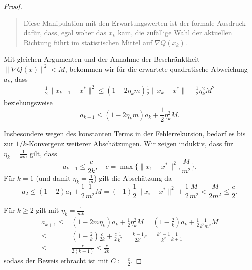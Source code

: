 \documentclass[
]{book}
\newenvironment {JHSAYS} [0] {\begin{quote}\color{jhsc}} {\end{quote}}
\theoremstyle{definition}
\theoremstyle{definition}
\theoremstyle{definition}
\theoremstyle{definition}
\theoremstyle{remark}
\begin{document}
\begin{proof}
\leavevmode\hypertarget{sdg-cnv-independent}{}%
\begin{JHSAYS}
Diese Manipulation mit den Erwartungswerten ist der formale Ausdruck dafür, dass, egal woher das \(x_k\) kam, die zufällige Wahl der aktuellen Richtung führt im statistischen Mittel auf \(\nabla Q(x_k)\).

\end{JHSAYS}

Mit gleichen Argumenten und der Annahme der Beschränktheit \(\|\nabla Q(x)\|^2 < M\), bekommen wir für die erwartete quadratische Abweichung \(a_k\), dass
\begin{equation*}
\begin{split}
\frac 12 \|x_{k+1} - x^* \|^2 \leq (1-2\eta_k m) \frac 12 \|x_{k} - x^*\| + \frac 12 \eta_k^2 M^2
\end{split}
\end{equation*}
beziehungsweise
\begin{equation*}
a_{k+1} \leq (1-2\eta_km)a_k + \frac 12\eta_k^2M.
\end{equation*}

Insbesondere wegen des konstanten Terms in der Fehlerrekursion, bedarf es bis zur \(1/k\)-Konvergenz weiterer Abschätzungen. Wir zeigen induktiv, dass für \(\eta_k=\frac{1}{km}\) gilt, dass
\begin{equation*}
a_{k+1} \leq \frac{c}{2k}, \quad c = \max\{\| x_1 - x^*\|^2, \frac{M}{m^2} \}.
\end{equation*}
Für \(k=1\) (und damit \(\eta_k = \frac 1m\)) gilt die Abschätzung da
\begin{equation*}
a_2 \leq (1-2)a_1 + \frac 12 \frac{1}{m^2}M = (-1)\frac 12 \|x_i-x^*\|^2 + \frac 12 \frac{M}{m^2} < \frac{M}{2 m^2} \leq \frac c2.
\end{equation*}

Für \(k\geq 2\) gilt mit \(\eta_k = \frac{1}{mk}\)
\begin{equation*}
\begin{split}
a_{k+1} \leq & (1-2m \eta_k)a_k + \frac 12 \eta_k^2 M =  (1-\frac 2k)a_k + \frac 12 \frac{1}{k^2m^2}M \\
\leq&  (1-\frac 2k) \frac c{2k} + \frac c2 \frac{1}{k^2}  =  \frac {k-1}{2k^2}c  = \frac{k^2-1}{k^2}\frac{1}{k+1} \\
\leq& \frac {c}{2(k+1)} \leq \frac{c}{2k}
\end{split}
\end{equation*}
sodass der Beweis erbracht ist mit \(C:=\frac c2\).
\end{proof}
\end{document}
